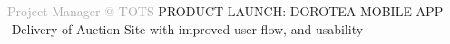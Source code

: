 \begin{cvtable}
{%
}

{\textcolor{darkgray}{Project Manager \newline @ TOTS}}%
{
}%
{%
    {\scriptsize PRODUCT LAUNCH: DOROTEA MOBILE APP} \\
      \textperiodcentered $ $ Delivery of Auction Site with improved user flow, and usability
    \\
}
% 
% 
{\textcolor{darkgray}{%
}}
\end{cvtable}
